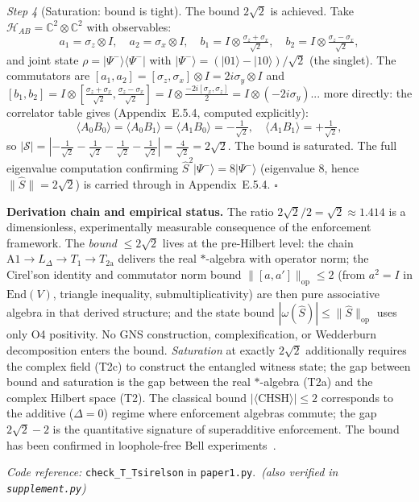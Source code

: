 \documentclass[11pt]{article}
\theoremstyle{remark}
\newcommand{\coderef}[2]{\smallskip\noindent\textit{Code reference:} \texttt{#1} in \texttt{#2}.}
\begin{document}
\begin{tcolorbox}[apfbox, title={$T_{\mathrm{Tsirelson}}$: CHSH Bound from Finite Enforcement Capacity}]
\textit{Step 4} (Saturation: bound is tight).  The bound $2\sqrt{2}$ is achieved.  Take $\mathcal{H}_{AB} = \mathbb{C}^2\otimes\mathbb{C}^2$ with observables:
\[
a_1 = \sigma_z \otimes I, \quad a_2 = \sigma_x\otimes I, \quad b_1 = I\otimes\tfrac{\sigma_z+\sigma_x}{\sqrt{2}}, \quad b_2 = I\otimes\tfrac{\sigma_z-\sigma_x}{\sqrt{2}},
\]
and joint state $\rho = |\Psi^-\rangle\langle\Psi^-|$ with $|\Psi^-\rangle = (|01\rangle - |10\rangle)/\sqrt{2}$ (the singlet).  The commutators are $[a_1,a_2] = [\sigma_z,\sigma_x]\otimes I = 2i\sigma_y\otimes I$ and $[b_1,b_2] = I\otimes[\tfrac{\sigma_z+\sigma_x}{\sqrt{2}},\tfrac{\sigma_z-\sigma_x}{\sqrt{2}}] = I\otimes\tfrac{-2i[\sigma_x,\sigma_z]}{2} = I\otimes(-2i\sigma_y)$... more directly: the correlator table gives (Appendix~E.5.4, computed explicitly):
\[
\langle A_0 B_0\rangle = \langle A_0 B_1\rangle = \langle A_1 B_0\rangle = -\tfrac{1}{\sqrt{2}}, \quad \langle A_1 B_1\rangle = +\tfrac{1}{\sqrt{2}},
\]
so $|\mathcal{S}| = |-\tfrac{1}{\sqrt{2}} - \tfrac{1}{\sqrt{2}} - \tfrac{1}{\sqrt{2}} - \tfrac{1}{\sqrt{2}}| = \tfrac{4}{\sqrt{2}} = 2\sqrt{2}$.  The bound is saturated.  The full eigenvalue computation confirming $\hat{S}^2|\Psi^-\rangle = 8|\Psi^-\rangle$ (eigenvalue 8, hence $\|\hat{S}\| = 2\sqrt{2}$) is carried through in Appendix~E.5.4.  \hfill$\square$

\smallskip\noindent\textbf{Derivation chain and empirical status.}  The ratio $2\sqrt{2}/2 = \sqrt{2} \approx 1.414$ is a dimensionless, experimentally measurable consequence of the enforcement framework.  The \emph{bound} $\le 2\sqrt{2}$ lives at the pre-Hilbert level: the chain $\mathrm{A1} \to L_\Delta \to T_1 \to T_{2\mathrm{a}}$ delivers the real $*$-algebra with operator norm; the Cirel'son identity and commutator norm bound $\|[a,a']\|_{\mathrm{op}} \le 2$ (from $a^2 = I$ in $\mathrm{End}(V)$, triangle inequality, submultiplicativity) are then pure associative algebra in that derived structure; and the state bound $|\omega(\hat{S})| \le \|\hat{S}\|_{\mathrm{op}}$ uses only O4 positivity.  No GNS construction, complexification, or Wedderburn decomposition enters the bound.  \emph{Saturation} at exactly $2\sqrt{2}$ additionally requires the complex field (T2c) to construct the entangled witness state; the gap between bound and saturation is the gap between the real $*$-algebra (T2a) and the complex Hilbert space (T2).  The classical bound $|\langle\mathrm{CHSH}\rangle| \le 2$ corresponds to the additive ($\Delta = 0$) regime where enforcement algebras commute; the gap $2\sqrt{2} - 2$ is the quantitative signature of superadditive enforcement.  The bound has been confirmed in loophole-free Bell experiments~\cite{Hensen2015,Giustina2015}.

\coderef{check\_T\_Tsirelson}{paper1.py}\,%
\hspace{1em}\textit{(also verified in \texttt{supplement.py})}
\end{tcolorbox}
\end{document}
